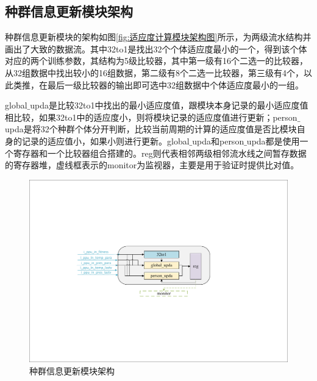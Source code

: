 \subsection{种群信息更新模块架构}
种群信息更新模块的架构如图\ref{fig:适应度计算模块架构图}所示，为两级流水结构并画出了大致的数据流。其中32to1是找出32个个体适应度最小的一个，得到该个体对应的两个训练参数，其结构为5级比较器，其中第一级有16个二选一的比较器，从32组数据中找出较小的16组数据，第二级有8个二选一比较器，第三级有4个，以此类推，在最后一级比较器的输出即可选中32组数据中个体适应度最小的一组。

global$\_$upda是比较32to1中找出的最小适应度值，跟模块本身记录的最小适应度值相比较，如果32to1中的适应度小，则将模块记录的适应度值进行更新；person$\_$upda是将32个种群个体分开判断，比较当前周期的计算的适应度值是否比模块自身的记录的适应值小，如果小则进行更新。global$\_$upda和person$\_$upda都是使用一个寄存器和一个比较器组合搭建的。reg则代表相邻两级相邻流水线之间暂存数据的寄存器堆，虚线框表示的monitor为监视器，主要是用于验证时提供比对值。
\begin{figure}[htb]
    \centering
    \includegraphics[width=12cm]{fig/5-fig/种群信息更新模块架构.pdf}
    \caption{种群信息更新模块架构}
    \label{fig:种群信息更新模块架构}
\end{figure}

